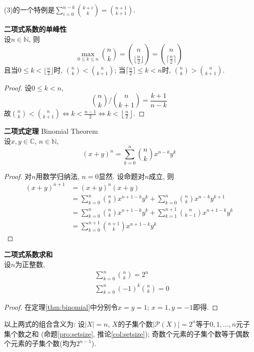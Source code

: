 \par (3)的一个特例是$\displaystyle \sum_{i=0}^{n-k} \binom{k+i}{k} = \binom{n+1}{k+1}$. 

\begin{pro} \textbf{二项式系数的单峰性}\\
设$n\in \mathbb{N}$, 则
\begin{equation}
    \max_{0\le k\le n} \binom{n}{k} = \binom{n}{\lfloor \frac{n}{2}\rfloor} = \binom{n}{\lceil \frac{n}{2}\rceil}
\end{equation}
且当$0\le k< \lfloor \frac{n}{2}\rfloor$时, $\displaystyle \binom{n}{k} < \binom{n}{k+1}$; 当$\lceil \frac{n}{2}\rceil \le k < n$时, $\displaystyle \binom{n}{k} > \binom{n}{k+1}$. 
\end{pro}
\begin{proof} 设$0\le k<n$, 
\begin{equation}
    \binom{n}{k}/\binom{n}{k+1} = \frac{k+1}{n-k}
\end{equation}
故$\displaystyle \binom{n}{k} < \binom{n}{k+1} \iff k<\frac{n-1}{2} \iff k< \left\lfloor \frac{n}{2}\right\rfloor$. 
\end{proof}

\begin{thm}\textbf{二项式定理} Binomial Theorem\\
设$x,y\in \mathbb{C}$, $n\in \mathbb{N}$, 
\begin{equation}
    (x+y)^n = \sum_{k=0}^n \binom{n}{k} x^{n-k}y^k
\end{equation}
\label{thm:binomial}
\end{thm}
\begin{proof}
对$n$用数学归纳法, $n=0$显然. 设命题对$n$成立, 则
\begin{align*}
    (x+y)^{n+1} &= (x+y)^n(x+y)\\
    &= \sum_{k=0}^n \binom{n}{k} x^{n+1-k}y^k + \sum_{k=0}^{n} \binom{n}{k} x^{n-k}y^{k+1}\\
    &= \sum_{k=0}^n \binom{n}{k} x^{n+1-k}y^k + \sum_{k=1}^{n+1} \binom{n}{k-1} x^{n+1-k}y^{k}\\
    &= \sum_{k=0}^{n+1} \binom{n+1}{k}x^{n+1-k}y^k
\end{align*}
\end{proof}

\begin{col}\textbf{二项式系数求和}\\
设$n$为正整数, 
\begin{align}
    &\sum_{k=0}^n \binom{n}{k}=2^n\\
    &\sum_{k=0}^n (-1)^k \binom{n}{k}=0
\end{align}
\end{col}
\begin{proof}
在定理\ref{thm:binomial}中分别令$x=y=1$; $x=1, y=-1$即得. 
\end{proof}
以上两式的组合含义为: 设$|X|=n$, $X$的子集个数$|\mathcal{P}(X)|=2^n$等于$0,1,\dots,n$元子集个数之和 (命题\ref{pro:setsize}, 推论\ref{col:setsize}); 奇数个元素的子集个数等于偶数个元素的子集个数(均为$2^{n-1}$). 

